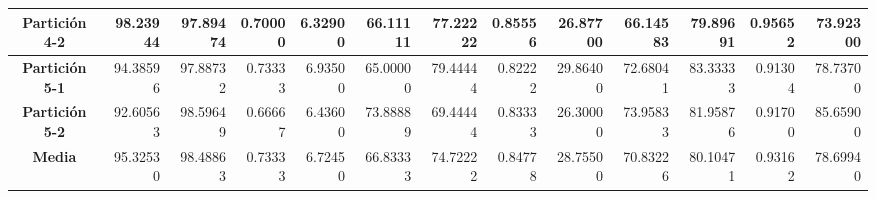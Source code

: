 \documentclass[a4paper,11pt]{article}
\begin{document}
\begin{table}[H]
\begin{adjustbox}{width=1.1\textwidth}
\begin{tabular}{|c|r|r|r|r|r|r|r|r|r|r|r|r|}
  \textbf{Partición 4-2} & 98.23944 & 97.89474 & 0.70000 & 6.32900 & 66.11111 & 77.22222 & 0.85556 & 26.87700 & 66.14583 & 79.89691 & 0.95652 & 73.92300 \\ \hline
  \textbf{Partición 5-1} & 94.38596 & 97.88732 & 0.73333 & 6.93500 & 65.00000 & 79.44444 & 0.82222 & 29.86400 & 72.68041 & 83.33333 & 0.91304 & 78.73700 \\ \hline
  \textbf{Partición 5-2} & 92.60563 & 98.59649 & 0.66667 & 6.43600 & 73.88889 & 69.44444 & 0.83333 & 26.30000 & 73.95833 & 81.95876 & 0.91700 & 85.65900 \\ \hline
  \textbf{Media} & 95.32530 & 98.48863 & 0.73333 & 6.72450 & 66.83333 & 74.72222 & 0.84778 & 28.75500 & 70.83226 & 80.10471 & 0.93162 & 78.69940 \\ \hline
  \end{tabular}
  \end{adjustbox}
  \label{GRASP}
  \end{table}
\end{document}
